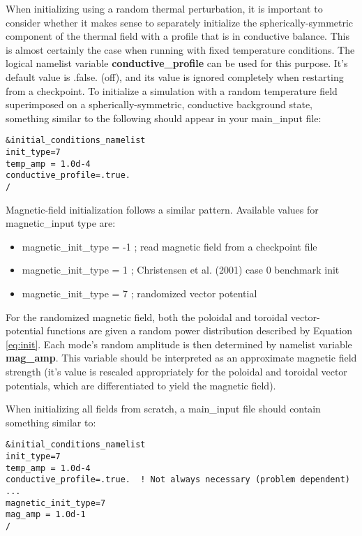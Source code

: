When initializing using a random thermal perturbation, it is important to consider whether it makes sense to separately initialize the spherically-symmetric component of the thermal field with a profile that is in conductive balance.  This is almost certainly the case when running with fixed temperature conditions.  The logical namelist variable \textbf{conductive\_profile} can be used for this purpose.  It's default value is .false. (off), and its value is ignored completely when restarting from a checkpoint.   To initialize a simulation with a random temperature field superimposed on a spherically-symmetric, conductive background state, something similar to the following should appear in your main\_input file:
\begin{lstlisting}
&initial_conditions_namelist
init_type=7
temp_amp = 1.0d-4
conductive_profile=.true.
/
\end{lstlisting}

Magnetic-field initialization follows a similar pattern.  Available values for magnetic\_input type are:
\begin{itemize}
\item magnetic\_init\_type = -1 ; read magnetic field from a checkpoint file
\item magnetic\_init\_type = 1 ; Christensen et al. (2001) case 0 benchmark init
\item magnetic\_init\_type = 7 ; randomized vector potential
\end{itemize}

For the randomized magnetic field, both the poloidal and toroidal vector-potential functions are given a random power distribution described by Equation \ref{eq:init}.  Each mode's random amplitude is then determined by namelist variable \textbf{mag\_amp}.   This variable should be interpreted as an approximate magnetic field strength (it's value is rescaled appropriately for the poloidal and toroidal vector potentials, which are differentiated to yield the magnetic field).  

When initializing all fields from scratch, a main\_input file should contain something similar to:
\begin{lstlisting}
&initial_conditions_namelist
init_type=7
temp_amp = 1.0d-4
conductive_profile=.true.  ! Not always necessary (problem dependent) ...
magnetic_init_type=7
mag_amp = 1.0d-1
/
\end{lstlisting}


